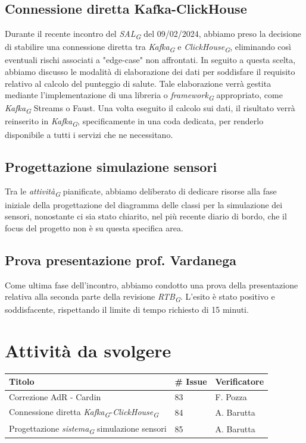 \documentclass{article}
\begin{document}
\subsection{Connessione diretta Kafka-ClickHouse}
Durante il recente incontro del \textit{SAL}\textsubscript{\textit{G}} del 09/02/2024, abbiamo preso la decisione di stabilire una connessione diretta tra \textit{Kafka}\textsubscript{\textit{G}} e \textit{ClickHouse}\textsubscript{\textit{G}}, eliminando così eventuali rischi associati a "edge-case" non affrontati. In seguito a questa scelta, abbiamo discusso le modalità di elaborazione dei dati per soddisfare il requisito relativo al calcolo del punteggio di salute. Tale elaborazione verrà gestita mediante l'implementazione di una libreria o \textit{framework}\textsubscript{\textit{G}} appropriato, come \textit{Kafka}\textsubscript{\textit{G}} Streams o Faust. Una volta eseguito il calcolo sui dati, il risultato verrà reinserito in \textit{Kafka}\textsubscript{\textit{G}}, specificamente in una coda dedicata, per renderlo disponibile a tutti i servizi che ne necessitano.

\subsection{Progettazione simulazione sensori}
Tra le \textit{attività}\textsubscript{\textit{G}} pianificate, abbiamo deliberato di dedicare risorse alla fase iniziale della progettazione del diagramma delle classi per la simulazione dei sensori, nonostante ci sia stato chiarito, nel più recente diario di bordo, che il focus del progetto non è su questa specifica area.

\subsection{Prova presentazione prof. Vardanega}
Come ultima fase dell'incontro, abbiamo condotto una prova della presentazione relativa alla seconda parte della revisione \textit{RTB}\textsubscript{\textit{G}}.
L'esito è stato positivo e soddisfacente, rispettando il limite di tempo richiesto di 15 minuti.

\section{Attività da svolgere}
    \begin{center}
        \begin{tabular}{|C{7cm}|C{1,5cm}|C{3cm}|}
            \hline
            \textbf{Titolo} & \textbf{\# Issue} & \textbf{Verificatore} \\
            \hline\hline
            Correzione AdR - Cardin & 83 & F. Pozza \\
            \hline
            Connessione diretta \textit{Kafka}\textsubscript{\textit{G}}-\textit{ClickHouse}\textsubscript{\textit{G}} & 84 & A. Barutta \\
            \hline
            Progettazione \textit{sistema}\textsubscript{\textit{G}} simulazione sensori & 85 & A. Barutta \\
            \hline
        \end{tabular}
    \end{center}
\end{document}
